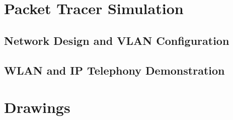\documentclass[12pt]{report}
\begin{document}
\chapter{Packet Tracer Simulation}

\section{Network Design and VLAN Configuration}

\section{WLAN and IP Telephony Demonstration}

\chapter{Drawings}

% 
% 
\end{document}
